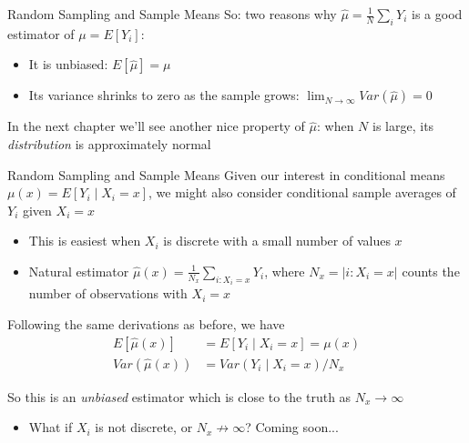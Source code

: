 \documentclass[11pt,english,handout]{beamer}
\begin{document}
\begin{frame}{Random Sampling and Sample Means}
\vspace{0.2cm}
So: two reasons why $\hat{\mu}=\frac{1}{N}\sum_i Y_i$ is a good estimator of $\mu=E[Y_i]$:

\begin{itemize}
\item It is unbiased: $E[\hat{\mu}]=\mu$
\vspace{0.1cm}
\item Its variance shrinks to zero as the sample grows: $\lim_{N\rightarrow\infty}Var(\hat{\mu})=0$ 
\end{itemize}
\vspace{0.5cm}
\pause{}


In the next chapter we'll see another nice property of $\hat{\mu}$: when $N$ is large, its \emph{distribution} is approximately normal

\end{frame}

\begin{frame}{Random Sampling and Sample Means}
\vspace{0.2cm}
Given our interest in conditional means $\mu(x)=E[Y_i\mid X_i=x]$, we might also consider conditional sample averages of $Y_i$ given $X_i=x$
\pause{}


\begin{itemize}
\item This is easiest when $X_i$ is discrete with a small number of values $x$
\vspace{0.1cm}\pause{}
\item Natural estimator $\hat{\mu}(x)=\frac{1}{N_x}\sum_{i:X_i=x}Y_i$, where $N_x=|i:X_i=x|$ counts the number of observations with $X_i=x$
\end{itemize}
\vspace{0.4cm}
\pause{}

Following the same derivations as before, we have 
\begin{align*}
E[\hat{\mu}(x)]&=E[Y_i\mid X_i=x]=\mu(x)\\
Var(\hat{\mu}(x))&=Var(Y_i\mid X_i=x)/N_x
\end{align*}
\pause{}
\vspace{-0.2cm}

So this is an \emph{unbiased} estimator which is close to the truth as $N_x\rightarrow\infty$
\pause{}

\begin{itemize}
\item What if $X_i$ is not discrete, or $N_x\not\rightarrow\infty$? Coming soon...
\end{itemize}

\end{frame}
\end{document}
